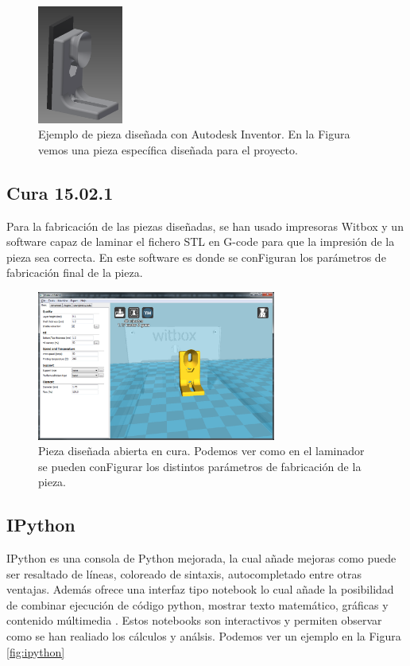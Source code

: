 \begin{figure}[H]
    \centering
    \includegraphics[width=0.25\textwidth]{images/peletizadora/guia.png}
    \caption[Ejemplo de pieza diseñada con Autodesk Inventor.]{Ejemplo de pieza diseñada con Autodesk Inventor. En la Figura vemos una pieza específica diseñada para el proyecto.}
    \label{fig:pieza}
\end{figure}

\subsection{Cura 15.02.1}
Para la fabricación de las piezas diseñadas, se han usado impresoras Witbox y un software capaz de laminar el fichero STL en G-code para que la impresión de la pieza sea correcta. En este software es donde se conFiguran los parámetros de fabricación final de la pieza.

\begin{figure}[H]
    \centering
    \includegraphics[width=0.7\textwidth]{images/cura.png}
    \caption[Pieza diseñada abierta en cura.]{Pieza diseñada abierta en cura. Podemos ver como en el laminador se pueden conFigurar los distintos parámetros de fabricación de la pieza.}
    \label{fig:cura}
\end{figure}

\subsection{IPython}
IPython\cite{PER-GRA:2007} es una consola de Python mejorada, la cual añade mejoras como puede ser resaltado de líneas, coloreado de sintaxis, autocompletado entre otras ventajas. Además ofrece una interfaz tipo notebook lo cual añade la posibilidad de combinar ejecución de código python, mostrar texto matemático, gráficas y contenido múltimedia \cite{ipython}. Estos notebooks son interactivos y permiten observar como se han realiado los cálculos y análsis. Podemos ver un ejemplo en la Figura \ref{fig:ipython}

